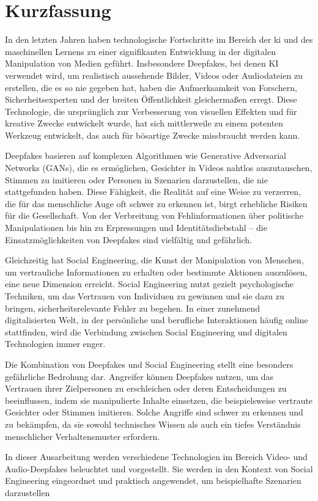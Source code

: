 \chapter{Kurzfassung}\label{ch:kurzfassung}

In den letzten Jahren haben technologische Fortschritte im Bereich der \gls{ki} und des maschinellen Lernens zu einer signifikanten Entwicklung in der digitalen Manipulation von Medien geführt.
Insbesondere Deepfakes, bei denen KI verwendet wird, um realistisch aussehende Bilder, Videos oder Audiodateien zu erstellen, die es so nie gegeben hat, haben die Aufmerksamkeit von Forschern, Sicherheitsexperten und der breiten Öffentlichkeit gleichermaßen erregt.
Diese Technologie, die ursprünglich zur Verbesserung von visuellen Effekten und für kreative Zwecke entwickelt wurde, hat sich mittlerweile zu einem potenten Werkzeug entwickelt, das auch für bösartige Zwecke missbraucht werden kann.

Deepfakes basieren auf komplexen Algorithmen wie Generative Adversarial Networks (GANs), die es ermöglichen, Gesichter in Videos nahtlos auszutauschen, Stimmen zu imitieren oder Personen in Szenarien darzustellen, die nie stattgefunden haben.
Diese Fähigkeit, die Realität auf eine Weise zu verzerren, die für das menschliche Auge oft schwer zu erkennen ist, birgt erhebliche Risiken für die Gesellschaft.
Von der Verbreitung von Fehlinformationen über politische Manipulationen bis hin zu Erpressungen und Identitätsdiebstahl – die Einsatzmöglichkeiten von Deepfakes sind vielfältig und gefährlich.

Gleichzeitig hat Social Engineering, die Kunst der Manipulation von Menschen, um vertrauliche Informationen zu erhalten oder bestimmte Aktionen auszulösen, eine neue Dimension erreicht.
Social Engineering nutzt gezielt psychologische Techniken, um das Vertrauen von Individuen zu gewinnen und sie dazu zu bringen, sicherheitsrelevante Fehler zu begehen.
In einer zunehmend digitalisierten Welt, in der persönliche und berufliche Interaktionen häufig online stattfinden, wird die Verbindung zwischen Social Engineering und digitalen Technologien immer enger.

Die Kombination von Deepfakes und Social Engineering stellt eine besonders gefährliche Bedrohung dar.
Angreifer können Deepfakes nutzen, um das Vertrauen ihrer Zielpersonen zu erschleichen oder deren Entscheidungen zu beeinflussen, indem sie manipulierte Inhalte einsetzen, die beispielsweise vertraute Gesichter oder Stimmen imitieren.
Solche Angriffe sind schwer zu erkennen und zu bekämpfen, da sie sowohl technisches Wissen als auch ein tiefes Verständnis menschlicher Verhaltensmuster erfordern.

In dieser Ausarbeitung werden verschiedene Technologien im Bereich Video- und Audio-Deepfakes beleuchtet und vorgestellt.
Sie werden in den Kontext von Social Engineering eingeordnet und praktisch angewendet, um beispielhafte Szenarien darzustellen
